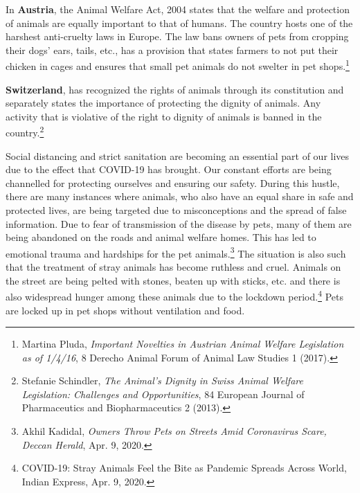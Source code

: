 \begin{multicols}{2}
\noi
In {\bf Austria}, the Animal Welfare Act, 2004 states that the welfare and protection of animals
are equally important to that of humans. The country hosts one of the harshest anti-cruelty
laws in Europe. The law bans owners of pets from cropping their dogs’ ears, tails, etc., has a
provision that states farmers to not put their chicken in cages and ensures that small pet
animals do not swelter in pet shops.\footnote{Martina Pluda, \textit{Important Novelties in Austrian Animal Welfare Legislation as of 1/4/16}, 8 Derecho Animal Forum of Animal Law Studies 1 (2017).}

\noi
{\bf Switzerland}, has recognized the rights of animals through its constitution and separately
states the importance of protecting the dignity of animals. Any activity that is violative of the
right to dignity of animals is banned in the country.\footnote{Stefanie Schindler, \textit{The Animal’s Dignity in Swiss Animal Welfare Legislation: Challenges and Opportunities}, 84 European Journal of Pharmaceutics and Biopharmaceutics 2 (2013).}

\vspace{.1cm}


\noi
Social distancing and strict sanitation are becoming an essential part of our lives due to the
effect that COVID-19 has brought. Our constant efforts are being channelled for protecting
ourselves and ensuring our safety. During this hustle, there are many instances where
animals, who also have an equal share in safe and protected lives, are being targeted due to
misconceptions and the spread of false information. Due to fear of transmission of the disease
by pets, many of them are being abandoned on the roads and animal welfare homes. This has
led to emotional trauma and hardships for the pet animals.\footnote{Akhil Kadidal, \textit{Owners Throw Pets on Streets Amid Coronavirus Scare, Deccan Herald}, Apr. 9, 2020. } The situation is also such that the
treatment of stray animals has become ruthless and cruel. Animals on the street are being
pelted with stones, beaten up with sticks, etc. and there is also widespread hunger among these animals due to the lockdown period.\footnote{ COVID-19: Stray Animals Feel the Bite as Pandemic Spreads Across World, Indian Express, Apr. 9, 2020.} Pets are locked up in pet shops without
ventilation and food.

\vspace{.1cm}


\end{multicols}
